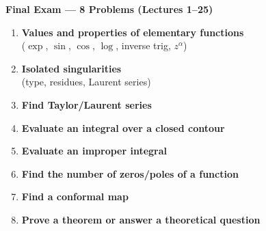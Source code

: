 \documentclass[12pt]{article}
\title{}
\author{Jerich Lee}
\date{\today}
\theoremstyle{definition} %
\theoremstyle{plain} %
\begin{document}
\maketitle
\begin{center}
  \Large\textbf{Final Exam — 8 Problems (Lectures 1--25)}
  \end{center}
  
  \begin{enumerate}
    \item \textbf{Values and properties of elementary functions}\\
          \hspace*{1.5em}($\exp$, $\sin$, $\cos$, $\log$, inverse trig, $z^{\alpha}$)
  
    \item \textbf{Isolated singularities}\\
          \hspace*{1.5em}(type, residues, Laurent series)
  
    \item \textbf{Find Taylor/Laurent series}
  
    \item \textbf{Evaluate an integral over a closed contour}
  
    \item \textbf{Evaluate an improper integral}
  
    \item \textbf{Find the number of zeros/poles of a function}
  
    \item \textbf{Find a conformal map}
  
    \item \textbf{Prove a theorem or answer a theoretical question}
  \end{enumerate}
\end{document}
